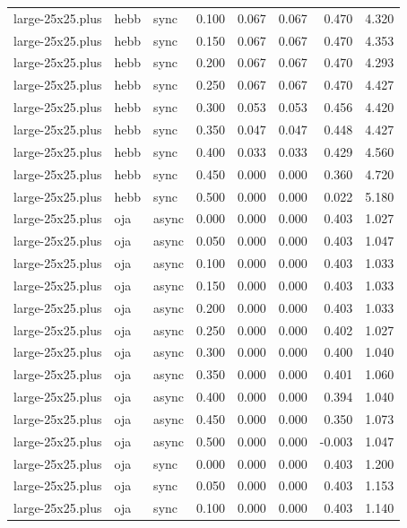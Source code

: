 \begin{tabular}{lllrrrrr}
large-25x25.plus & hebb & sync & 0.100 & 0.067 & 0.067 & 0.470 & 4.320 \\
large-25x25.plus & hebb & sync & 0.150 & 0.067 & 0.067 & 0.470 & 4.353 \\
large-25x25.plus & hebb & sync & 0.200 & 0.067 & 0.067 & 0.470 & 4.293 \\
large-25x25.plus & hebb & sync & 0.250 & 0.067 & 0.067 & 0.470 & 4.427 \\
large-25x25.plus & hebb & sync & 0.300 & 0.053 & 0.053 & 0.456 & 4.420 \\
large-25x25.plus & hebb & sync & 0.350 & 0.047 & 0.047 & 0.448 & 4.427 \\
large-25x25.plus & hebb & sync & 0.400 & 0.033 & 0.033 & 0.429 & 4.560 \\
large-25x25.plus & hebb & sync & 0.450 & 0.000 & 0.000 & 0.360 & 4.720 \\
large-25x25.plus & hebb & sync & 0.500 & 0.000 & 0.000 & 0.022 & 5.180 \\
large-25x25.plus & oja & async & 0.000 & 0.000 & 0.000 & 0.403 & 1.027 \\
large-25x25.plus & oja & async & 0.050 & 0.000 & 0.000 & 0.403 & 1.047 \\
large-25x25.plus & oja & async & 0.100 & 0.000 & 0.000 & 0.403 & 1.033 \\
large-25x25.plus & oja & async & 0.150 & 0.000 & 0.000 & 0.403 & 1.033 \\
large-25x25.plus & oja & async & 0.200 & 0.000 & 0.000 & 0.403 & 1.033 \\
large-25x25.plus & oja & async & 0.250 & 0.000 & 0.000 & 0.402 & 1.027 \\
large-25x25.plus & oja & async & 0.300 & 0.000 & 0.000 & 0.400 & 1.040 \\
large-25x25.plus & oja & async & 0.350 & 0.000 & 0.000 & 0.401 & 1.060 \\
large-25x25.plus & oja & async & 0.400 & 0.000 & 0.000 & 0.394 & 1.040 \\
large-25x25.plus & oja & async & 0.450 & 0.000 & 0.000 & 0.350 & 1.073 \\
large-25x25.plus & oja & async & 0.500 & 0.000 & 0.000 & -0.003 & 1.047 \\
large-25x25.plus & oja & sync & 0.000 & 0.000 & 0.000 & 0.403 & 1.200 \\
large-25x25.plus & oja & sync & 0.050 & 0.000 & 0.000 & 0.403 & 1.153 \\
large-25x25.plus & oja & sync & 0.100 & 0.000 & 0.000 & 0.403 & 1.140 \\

\end{tabular}
